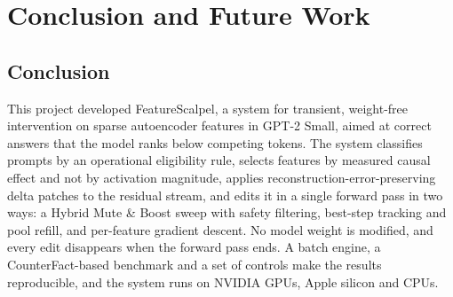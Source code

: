 \documentclass[12pt,a4paper]{report}
\begin{document}
\chapter{Conclusion and Future Work}\label{ch:conclusion-and-future-work}

\section{Conclusion}

This project developed FeatureScalpel, a system for transient, weight-free intervention on sparse autoencoder features in GPT-2 Small, aimed at correct answers that the model ranks below competing tokens. The system classifies prompts by an operational eligibility rule, selects features by measured causal effect and not by activation magnitude, applies reconstruction-error-preserving delta patches to the residual stream, and edits it in a single forward pass in two ways: a Hybrid Mute \& Boost sweep with safety filtering, best-step tracking and pool refill, and per-feature gradient descent. No model weight is modified, and every edit disappears when the forward pass ends. A batch engine, a CounterFact-based benchmark and a set of controls make the results reproducible, and the system runs on NVIDIA GPUs, Apple silicon and CPUs.
\end{document}
